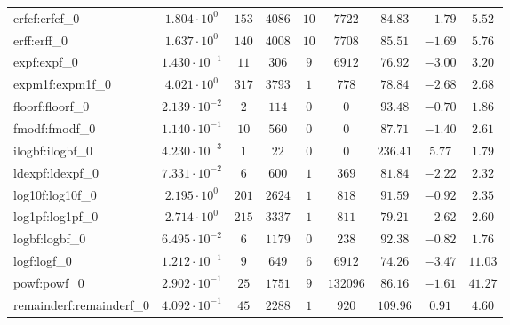 \begin{tabular}{|l|c|c|c|c|c|c|c|c|}
erfcf:erfcf\_0               & $ 1.804 \cdot 10^{0}  $ & $ 153    $ & $ 4086  $ & $ 10  $ & $ 7722   $ & $ 84.83       $ & $ -1.79   $ & $ 5.52    $ \\
erff:erff\_0                 & $ 1.637 \cdot 10^{0}  $ & $ 140    $ & $ 4008  $ & $ 10  $ & $ 7708   $ & $ 85.51       $ & $ -1.69   $ & $ 5.76    $ \\
expf:expf\_0                 & $ 1.430 \cdot 10^{-1} $ & $ 11     $ & $ 306   $ & $ 9   $ & $ 6912   $ & $ 76.92       $ & $ -3.00   $ & $ 3.20    $ \\
expm1f:expm1f\_0             & $ 4.021 \cdot 10^{0}  $ & $ 317    $ & $ 3793  $ & $ 1   $ & $ 778    $ & $ 78.84       $ & $ -2.68   $ & $ 2.68    $ \\
floorf:floorf\_0             & $ 2.139 \cdot 10^{-2} $ & $ 2      $ & $ 114   $ & $ 0   $ & $ 0      $ & $ 93.48       $ & $ -0.70   $ & $ 1.86    $ \\
fmodf:fmodf\_0               & $ 1.140 \cdot 10^{-1} $ & $ 10     $ & $ 560   $ & $ 0   $ & $ 0      $ & $ 87.71       $ & $ -1.40   $ & $ 2.61    $ \\
ilogbf:ilogbf\_0             & $ 4.230 \cdot 10^{-3} $ & $ 1      $ & $ 22    $ & $ 0   $ & $ 0      $ & $ 236.41      $ & $ 5.77    $ & $ 1.79    $ \\
ldexpf:ldexpf\_0             & $ 7.331 \cdot 10^{-2} $ & $ 6      $ & $ 600   $ & $ 1   $ & $ 369    $ & $ 81.84       $ & $ -2.22   $ & $ 2.32    $ \\
log10f:log10f\_0             & $ 2.195 \cdot 10^{0}  $ & $ 201    $ & $ 2624  $ & $ 1   $ & $ 818    $ & $ 91.59       $ & $ -0.92   $ & $ 2.35    $ \\
log1pf:log1pf\_0             & $ 2.714 \cdot 10^{0}  $ & $ 215    $ & $ 3337  $ & $ 1   $ & $ 811    $ & $ 79.21       $ & $ -2.62   $ & $ 2.60    $ \\
logbf:logbf\_0               & $ 6.495 \cdot 10^{-2} $ & $ 6      $ & $ 1179  $ & $ 0   $ & $ 238    $ & $ 92.38       $ & $ -0.82   $ & $ 1.76    $ \\
logf:logf\_0                 & $ 1.212 \cdot 10^{-1} $ & $ 9      $ & $ 649   $ & $ 6   $ & $ 6912   $ & $ 74.26       $ & $ -3.47   $ & $ 11.03   $ \\
powf:powf\_0                 & $ 2.902 \cdot 10^{-1} $ & $ 25     $ & $ 1751  $ & $ 9   $ & $ 132096 $ & $ 86.16       $ & $ -1.61   $ & $ 41.27   $ \\
remainderf:remainderf\_0     & $ 4.092 \cdot 10^{-1} $ & $ 45     $ & $ 2288  $ & $ 1   $ & $ 920    $ & $ 109.96      $ & $ 0.91    $ & $ 4.60    $ \\

\end{tabular}
